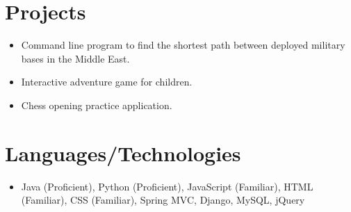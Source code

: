 \documentclass[a4paper,10pt]{article}
\begin{document}
\section*{Projects}
\begin{itemize}[leftmargin=*]
    \item Command line program to find the shortest path between deployed military bases in the Middle East.
    \item Interactive adventure game for children.
    \item Chess opening practice application.
\end{itemize}

\section*{Languages/Technologies}
\begin{itemize}[leftmargin=*]
    \item Java (Proficient), Python (Proficient), JavaScript (Familiar), HTML (Familiar), CSS (Familiar), Spring MVC, Django, MySQL, jQuery
\end{itemize}
\end{document}
